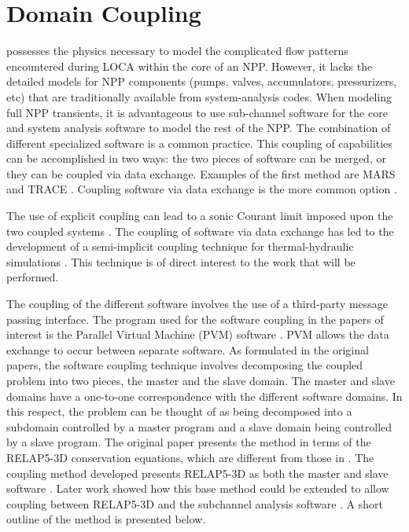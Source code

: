 \section{Domain Coupling}
\label{sect:code_coupling}

\cobra{} possesses the physics necessary to model the complicated flow patterns encountered during LOCA within the core of an NPP.
However, it lacks the detailed models for NPP components (pumps, valves, accumulators, pressurizers, etc) that are traditionally available from system-analysis codes.
When modeling full NPP transients, it is advantageous to use sub-channel software for the core and system analysis software to model the rest of the NPP.
The combination of different specialized software is a common practice.
This coupling of capabilities can be accomplished in two ways: the two pieces of software can be merged, or they can be coupled via data exchange.
Examples of the first method are MARS \cite{Jeong2008} and TRACE \cite{TRACE}.
Coupling software via data exchange is the more common option \cite{Makihara2003, Aumiller2002, Aumiller2001, Avramova2006, Weaver2002, Rodriguez2002}.

The use of explicit coupling can lead to a sonic Courant limit imposed upon the two coupled systems \cite{Ragusa2009, Aumiller2001}.
The coupling of software via data exchange has led to the development of a semi-implicit coupling technique for thermal-hydraulic simulations \cite{Weaver2002, Aumiller2002}.
This technique is of direct interest to the work that will be performed.

The coupling of the different software involves the use of a third-party message passing interface.
The program used for the software coupling in the papers of interest is the Parallel Virtual Machine (PVM) software \cite{Geist1994}.
PVM allows the data exchange to occur between separate software.
As formulated in the original papers, the software coupling technique involves decomposing the coupled problem into two pieces, the master and the slave domain.
The master and slave domains have a one-to-one correspondence with the different software domains.
In this respect, the problem can be thought of as being decomposed into a subdomain controlled by a master program and a slave domain being controlled by a slave program.
The original paper presents the method in terms of the RELAP5-3D conservation equations, which are different from those in \cobra{}.
The coupling method developed presents RELAP5-3D as both the master and slave software \cite{Weaver2002}.
Later work showed how this base method could be extended to allow coupling between RELAP5-3D and the \cobra{} subchannel analysis software \cite{Aumiller2002}.
A short outline of the method is presented below.

